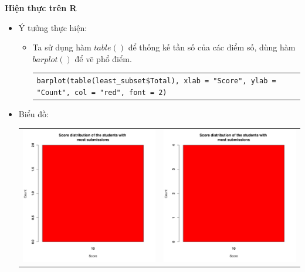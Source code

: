 \documentclass[a4paper]{article}
\theoremstyle{definition}
\begin{document}
\begin{enumerate}[a)]
\begin{itemize}
\begin{itemize}
        \end{itemize}
    \end{itemize}
    \bf Hiện thực trên R\normalfont
    \begin{itemize}
        \item Ý tưởng thực hiện:
        \begin{itemize}
            \item Ta sử dụng hàm $table()$ để thống kế tần số của các điểm số, dùng hàm $barplot()$ để vẽ phổ điểm.
            \begin{center}
                \begin{tabular}{p{13cm}}
                    \texttt{barplot(table(least\_subset\$Total), xlab = "Score", ylab = "Count", col = "red", font = 2)}
                \end{tabular}
            \end{center}
        \end{itemize}
        \item Biểu đồ:\\
        \begin{center}
            \begin{tabular}{c c}
                 \includegraphics[width = 6.9cm]{Images/img3-2-1.png} & \includegraphics[width = 6.9cm]{Images/img3-2-2.png} \\

\end{tabular}
\end{center}
\end{itemize}
\end{enumerate}
\end{document}

